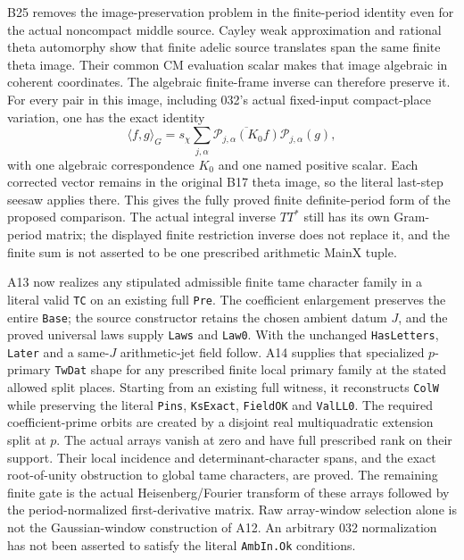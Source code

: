 \documentclass[11pt]{article}
\theoremstyle{definition}\newtheorem{definition}[theorem]{Definition}\newtheorem{remark}[theorem]{Remark}
\begin{document}
B25 removes the image-preservation problem in the finite-period
identity even for the actual noncompact middle source. Cayley
weak approximation and rational theta automorphy show that
finite adelic source translates span the same finite theta
image. Their common CM evaluation scalar makes that image
algebraic in coherent coordinates. The algebraic finite-frame
inverse can therefore preserve it. For every pair in this
image, including 032's actual fixed-input compact-place
variation, one has the exact identity
\[
 \langle f,g\rangle_G
   =s_\chi\sum_{j,\alpha}
       \overline{\mathcal P_{j,\alpha}(K_0f)}
                     \mathcal P_{j,\alpha}(g),
\]
with one algebraic correspondence $K_0$ and one named positive
scalar. Each corrected vector remains in the original B17
theta image, so the literal last-step seesaw applies there.
This gives the fully proved finite definite-period form of
the proposed comparison. The actual integral inverse $TT^*$
still has its own Gram-period matrix; the displayed finite
restriction inverse does not replace it, and the finite sum
is not asserted to be one prescribed arithmetic MainX tuple.

A13 now realizes any stipulated admissible finite tame character
family in a literal valid \texttt{TC} on an existing full
\texttt{Pre}. The coefficient enlargement preserves the entire
\texttt{Base}; the source constructor retains the chosen ambient
datum $J$, and the proved universal laws supply \texttt{Laws}
and \texttt{Law0}. With the unchanged \texttt{HasLetters},
\texttt{Later} and a same-$J$ arithmetic-jet field follow.
A14 supplies that specialized $p$-primary \texttt{TwDat} shape
for any prescribed finite local primary family at the stated
allowed split places. Starting from an existing full witness,
it reconstructs \texttt{ColW} while preserving the literal
\texttt{Pins}, \texttt{KsExact}, \texttt{FieldOK} and
\texttt{ValLL0}. The required coefficient-prime orbits are
created by a disjoint real multiquadratic extension split at $p$.
The actual arrays vanish at zero and have full prescribed rank
on their support. Their local incidence and determinant-character
spans, and the exact root-of-unity obstruction to global tame
characters, are proved. The remaining finite gate is the actual
Heisenberg/Fourier transform of these arrays followed by the
period-normalized first-derivative matrix. Raw array-window
selection alone is not the Gaussian-window construction of A12.
An arbitrary 032 normalization has not been asserted to satisfy
the literal \texttt{AmbIn.Ok} conditions.
\end{document}
